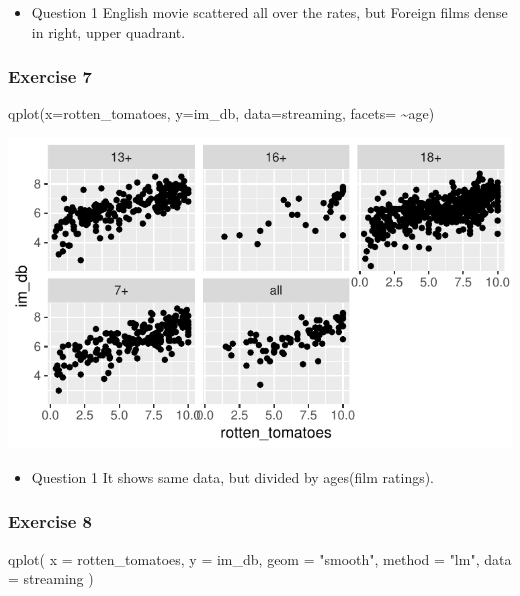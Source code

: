 \documentclass[
  11pt,
]{article}
\newenvironment{Shaded}{\begin{snugshade}}{\end{snugshade}}
\newcommand{\AttributeTok}[1]{\textcolor[rgb]{0.77,0.63,0.00}{#1}}
\newcommand{\FunctionTok}[1]{\textcolor[rgb]{0.00,0.00,0.00}{#1}}
\newcommand{\NormalTok}[1]{#1}
\newcommand{\SpecialCharTok}[1]{\textcolor[rgb]{0.00,0.00,0.00}{#1}}
\newcommand{\StringTok}[1]{\textcolor[rgb]{0.31,0.60,0.02}{#1}}
\providecommand{\tightlist}{%
  \setlength{\itemsep}{0pt}\setlength{\parskip}{0pt}}
\begin{document}
\begin{itemize}
\tightlist
\item
  Question 1 English movie scattered all over the rates, but Foreign
  films dense in right, upper quadrant.
\end{itemize}

\hypertarget{exercise-7}{%
\subsubsection{Exercise 7}\label{exercise-7}}

\begin{Shaded}
\begin{Highlighting}[]
\FunctionTok{qplot}\NormalTok{(}\AttributeTok{x=}\NormalTok{rotten\_tomatoes, }\AttributeTok{y=}\NormalTok{im\_db, }\AttributeTok{data=}\NormalTok{streaming, }\AttributeTok{facets=} \SpecialCharTok{\textasciitilde{}}\NormalTok{age)}
\end{Highlighting}
\end{Shaded}

\begin{center}\includegraphics[width=0.8\linewidth]{lab02_files/figure-latex/unnamed-chunk-6-1} \end{center}

\begin{itemize}
\tightlist
\item
  Question 1 It shows same data, but divided by ages(film ratings).
\end{itemize}

\hypertarget{exercise-8}{%
\subsubsection{Exercise 8}\label{exercise-8}}

\begin{Shaded}
\begin{Highlighting}[]
\FunctionTok{qplot}\NormalTok{(}
  \AttributeTok{x =}\NormalTok{ rotten\_tomatoes, }
  \AttributeTok{y =}\NormalTok{ im\_db, }
  \AttributeTok{geom =} \StringTok{"smooth"}\NormalTok{, }
  \AttributeTok{method =} \StringTok{"lm"}\NormalTok{, }
  \AttributeTok{data =}\NormalTok{ streaming}
\NormalTok{  )}
\end{Highlighting}
\end{Shaded}
\end{document}
